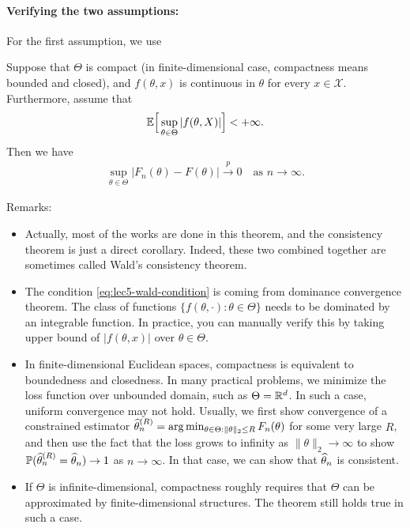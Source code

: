 \documentclass[11pt,letterpaper]{article}
\numberwithin{assumption}{lecture}
\numberwithin{theorem}{lecture}
\numberwithin{proposition}{lecture}
\numberwithin{lemma}{lecture}
\numberwithin{claim}{lecture}
\numberwithin{corollary}{lecture}
\numberwithin{definition}{lecture}
\numberwithin{conjecture}{lecture}
\numberwithin{remark}{lecture}
\numberwithin{example}{lecture}
\numberwithin{equation}{lecture}
\begin{document}
\paragraph{Verifying the two assumptions:} For the first assumption, we use
\begin{theorem}
  Suppose that $\Theta$ is compact (in finite-dimensional case, compactness means bounded and closed), and $f (\theta, x)$ is continuous in $\theta$ for every $x \in \mathcal{X}$. Furthermore, assume that
  \begin{align}
    {\mathbb{E}} \Big[ \sup_{\theta \in \Theta} |f (\theta, X) | \Big] < + \infty.\label{eq:lec5-wald-condition}
  \end{align}
  Then we have
  \begin{align*}
    \sup_{\theta \in \Theta} |F_n (\theta) - F(\theta)| \xrightarrow{p} 0 \quad \text{as } n \to \infty.
  \end{align*}
\end{theorem}
Remarks:
\begin{itemize}
  \item Actually, most of the works are done in this theorem, and the consistency theorem is just a direct corollary. Indeed, these two combined together are sometimes called Wald's consistency theorem.
  \item The condition \eqref{eq:lec5-wald-condition} is coming from dominance convergence theorem. The class of functions $\{f (\theta, \cdot): \theta \in \Theta\}$ needs to be dominated by an integrable function. In practice, you can manually verify this by taking upper bound of $|f (\theta, x)|$ over $\theta \in \Theta$.
  \item In finite-dimensional Euclidean spaces, compactness is equivalent to boundedness and closedness. In many practical problems, we minimize the loss function over unbounded domain, such as $\Theta = \mathbb{R}^d$. In such a case, uniform convergence may not hold. Usually, we first show convergence of a constrained estimator $\widehat{\theta}_n^{(R)} = \arg\min_{\theta \in \Theta: \|\theta\|_2 \leq R} F_n (\theta)$ for some very large $R$, and then use the fact that the loss grows to infinity as $\|\theta\|_2 \to \infty$ to show ${\mathbb{P}} (\widehat{\theta}_n^{(R)} = \widehat{\theta}_n) \to 1$ as $n \to \infty$. In that case, we can show that $\widehat{\theta}_n$ is consistent.
  \item If $\Theta$ is infinite-dimensional, compactness roughly requires that $\Theta$ can be approximated by finite-dimensional structures. The theorem still holds true in such a case.
\end{itemize}
\end{document}
